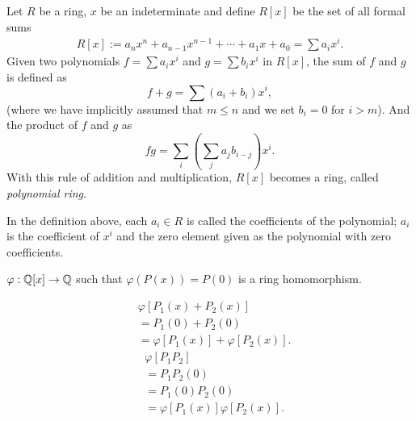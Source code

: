 \begin{definition}[Polynomial Ring]
    Let $R$ be a ring, $x$ be an indeterminate and define $R[x]$ be the set of all formal sums
    \begin{align*}
        R[x] := a_nx^n + a_{n-1}x^{n-1} + \cdots + a_1x + a_0 = \sum a_ix^i.
    \end{align*}
    Given two polynomials $f = \sum a_ix^i$ and $g = \sum b_ix^i$ in $R[x]$, the sum of $f$ and $g$ is defined as
        \[f + g = \sum (a_i + b_i)x^i,\]
    (where we have implicitly assumed that $m \leq n$ and we set $b_i = 0$ for $i > m$).
    And the product of $f$ and $g$ as
    \[fg = \sum_{i}^{}(\sum_{j}^{}a_jb_{i-j})x^i.\]
    With this rule of addition and multiplication, $R[x]$ becomes a ring, called \textit{polynomial ring}. 
\end{definition}
In the definition above, each $a_i \in R$ is called the coefficients of the polynomial; $a_i$ is the coefficient of $x^i$ and the zero element given as the polynomial with zero coefficients.
\begin{eg}
    $\varphi: \mathbb{Q}[x] \rightarrow \mathbb{Q}$ such that $\varphi(P(x)) = P(0)$ is a ring homomorphism.
\end{eg}
\begin{explanation}
    \begin{align*}
        &\varphi[P_1(x) + P_2(x)]\\
        &= P_1(0) + P_2(0)\\
        &= \varphi[P_1(x)] + \varphi[P_2(x)].
    \end{align*}
     \begin{align*}
        &\varphi[P_1 P_2]\\
        &= P_1P_2(0)\\
        &= P_1(0) P_2(0)\\
        &= \varphi[P_1(x)]  \varphi[P_2(x)].
    \end{align*}
\end{explanation}
